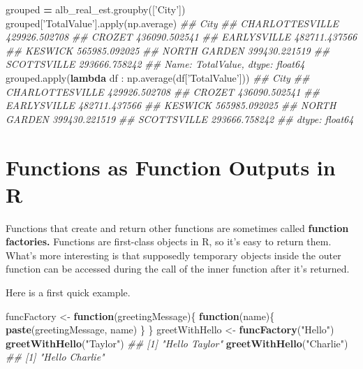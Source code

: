 \documentclass[12pt,krantz2]{krantz}
\makeatletter
\newenvironment{Shaded}{\begin{snugshade}}{\end{snugshade}}
\newcommand{\BuiltInTok}[1]{#1}
\newcommand{\CommentTok}[1]{\textcolor[rgb]{0.37,0.37,0.37}{\textit{#1}}}
\newcommand{\ControlFlowTok}[1]{\textcolor[rgb]{0.27,0.27,0.27}{\textbf{#1}}}
\newcommand{\KeywordTok}[1]{\textcolor[rgb]{0.27,0.27,0.27}{\textbf{#1}}}
\newcommand{\NormalTok}[1]{#1}
\newcommand{\OperatorTok}[1]{\textcolor[rgb]{0.43,0.43,0.43}{\textbf{#1}}}
\newcommand{\StringTok}[1]{\textcolor[rgb]{0.5,0.5,0.5}{#1}}
\newenvironment{kframe}{%
\medskip{}
\setlength{\fboxsep}{.8em}
 \def\at@end@of@kframe{}%
 \ifinner\ifhmode%
  \def\at@end@of@kframe{\end{minipage}}%
  \begin{minipage}{\columnwidth}%
 \fi\fi%
 \def\FrameCommand##1{\hskip\@totalleftmargin \hskip-\fboxsep
 \colorbox{shadecolor}{##1}\hskip-\fboxsep
     \hskip-\linewidth \hskip-\@totalleftmargin \hskip\columnwidth}%
 \MakeFramed {\advance\hsize-\width
   \@totalleftmargin\z@ \linewidth\hsize
   \@setminipage}}%
 {\par\unskip\endMakeFramed%
 \at@end@of@kframe}
\renewenvironment{Shaded}{\begin{kframe}}{\end{kframe}}
\makeatother
\begin{document}
\begin{Shaded}
\begin{Highlighting}[]
\NormalTok{grouped }\OperatorTok{=}\NormalTok{ alb_real_est.groupby([}\StringTok{'City'}\NormalTok{])}
\NormalTok{grouped[}\StringTok{'TotalValue'}\NormalTok{].}\BuiltInTok{apply}\NormalTok{(np.average)}
\CommentTok{## City}
\CommentTok{## CHARLOTTESVILLE    429926.502708}
\CommentTok{## CROZET             436090.502541}
\CommentTok{## EARLYSVILLE        482711.437566}
\CommentTok{## KESWICK            565985.092025}
\CommentTok{## NORTH GARDEN       399430.221519}
\CommentTok{## SCOTTSVILLE        293666.758242}
\CommentTok{## Name: TotalValue, dtype: float64}
\NormalTok{grouped.}\BuiltInTok{apply}\NormalTok{(}\KeywordTok{lambda}\NormalTok{ df : np.average(df[}\StringTok{'TotalValue'}\NormalTok{]))}
\CommentTok{## City}
\CommentTok{## CHARLOTTESVILLE    429926.502708}
\CommentTok{## CROZET             436090.502541}
\CommentTok{## EARLYSVILLE        482711.437566}
\CommentTok{## KESWICK            565985.092025}
\CommentTok{## NORTH GARDEN       399430.221519}
\CommentTok{## SCOTTSVILLE        293666.758242}
\CommentTok{## dtype: float64}
\end{Highlighting}
\end{Shaded}

\hypertarget{functions-as-function-outputs-in-r}{%
\section{Functions as Function Outputs in R}\label{functions-as-function-outputs-in-r}}

Functions that create and return other functions are sometimes called \textbf{function factories.} Functions are first-class objects in R, so it's easy to return them. What's more interesting is that supposedly temporary objects inside the outer function can be accessed during the call of the inner function after it's returned.

Here is a first quick example.

\begin{Shaded}
\begin{Highlighting}[]
\NormalTok{funcFactory <-}\StringTok{ }\ControlFlowTok{function}\NormalTok{(greetingMessage)\{}
  \ControlFlowTok{function}\NormalTok{(name)\{}
    \KeywordTok{paste}\NormalTok{(greetingMessage, name)}
\NormalTok{  \}}
\NormalTok{\}}
\NormalTok{greetWithHello <-}\StringTok{ }\KeywordTok{funcFactory}\NormalTok{(}\StringTok{"Hello"}\NormalTok{)}
\KeywordTok{greetWithHello}\NormalTok{(}\StringTok{"Taylor"}\NormalTok{)}
\CommentTok{## [1] "Hello Taylor"}
\KeywordTok{greetWithHello}\NormalTok{(}\StringTok{"Charlie"}\NormalTok{)}
\CommentTok{## [1] "Hello Charlie"}
\end{Highlighting}
\end{Shaded}
\end{document}
